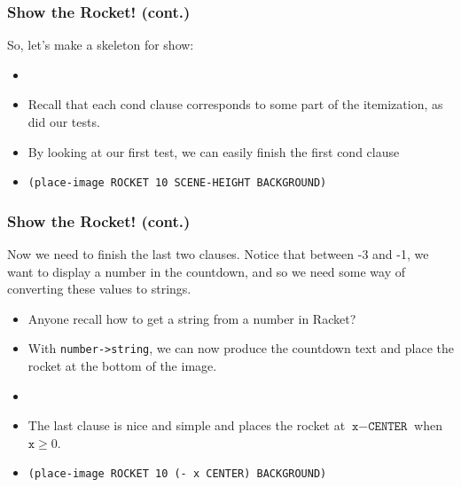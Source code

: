 \documentclass{beamer}
\begin{document}

\begin{frame}
  \frametitle{Show the Rocket! (cont.)}
  So, let's make a skeleton for show:
  \begin{itemize}
  \item<2-> \showSkeleton
  \item<3-> Recall that each cond clause corresponds to some part of the
    itemization, as did our tests.
  \item<4-> By looking at our first test, we can easily finish the first
    cond clause
  \item<5-> \texttt{(place-image ROCKET 10 SCENE-HEIGHT BACKGROUND)}
  \end{itemize}
\end{frame}


\begin{frame}
  \frametitle{Show the Rocket! (cont.)}
  Now we need to finish the last two clauses. Notice that between -3 and -1,
  we want to display a  number in the countdown, and so we need some way of
  converting these values to strings.
  \begin{itemize}
  \item<2-> Anyone recall how to get a string from a number in Racket?
  \item<3-> With \texttt{number->string}, we can now produce
    the countdown text and place the rocket at the bottom of the image.
  \item<4-> \countDown
  \item<5-> The last clause is nice and simple and places the rocket at $\texttt{x} - \texttt{CENTER}$ when $\texttt{x} \ge 0$.
  \item<6-> \texttt{(place-image ROCKET 10 (- x CENTER) BACKGROUND)}
  \end{itemize}
\end{frame}
\end{document}
